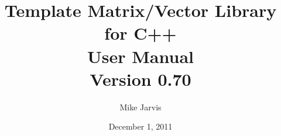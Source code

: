 \documentclass[twoside,letterpaper,11pt]{article}
\newcommand{\tmvversion}{0.70}
\begin{document}
\title{Template Matrix/Vector Library for C++ \\ User Manual \\ Version \tmvversion}
\author{Mike Jarvis}
\date{December 1, 2011}
\maketitle

\tableofcontents

\newpage


\newpage


\newpage


\newpage


\newpage


\newpage


\newpage


\newpage


\newpage


\newpage


\newpage


\newpage


\newpage


\newpage


\newpage


\newpage


\newpage


\newpage


\newpage


\newpage
\printindex
\end{document}
